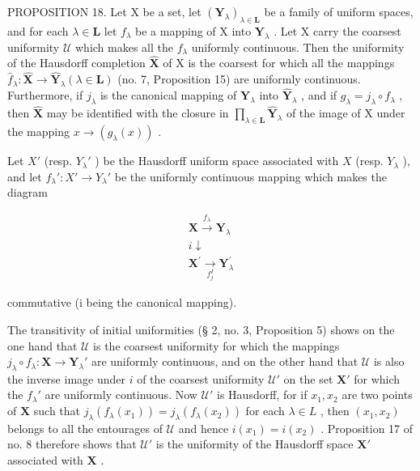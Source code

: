 PROPOSITION 18. Let X be a set, let \((\mathbf{Y}_{\lambda})_{\lambda \in \mathbf{L}}\) be a family of uniform spaces, and for each \(\lambda \in \mathbf{L}\) let \(f_{\lambda}\) be a mapping of X into \(\mathbf{Y}_{\lambda}\) . Let X carry the coarsest uniformity \(\mathcal{U}\) which makes all the \(f_{\lambda}\) uniformly continuous. Then the uniformity of the Hausdorff completion \(\hat{\mathbf{X}}\) of X is the coarsest for which all the mappings \(\hat{f}_{\lambda} \colon \hat{\mathbf{X}} \to \hat{\mathbf{Y}}_{\lambda} (\lambda \in \mathbf{L})\) (no. 7, Proposition 15) are uniformly continuous. Furthermore, if \(j_{\lambda}\) is the canonical mapping of \(\mathbf{Y}_{\lambda}\) into \(\hat{\mathbf{Y}}_{\lambda}\) , and if \(g_{\lambda} = j_{\lambda} \circ f_{\lambda}\) , then \(\hat{\mathbf{X}}\) may be identified with the closure in \(\prod_{\lambda \in \mathbf{L}} \hat{\mathbf{Y}}_{\lambda}\) of the image of X under the mapping \(x \to (g_{\lambda}(x))\) .

Let \(X'\) (resp. \(Y_{\lambda}'\) ) be the Hausdorff uniform space associated with \(X\) (resp. \(Y_{\lambda}\) ), and let \(f_{\lambda}' \colon X' \to Y_{\lambda}'\) be the uniformly continuous mapping which makes the diagram

\[
\begin{array}{c} \mathbf {X} \xrightarrow {f _ {\lambda}} \mathbf {Y} _ {\lambda} \\ i \downarrow \\ \mathbf {X ^ {\prime}} \xrightarrow [ f _ {j} ^ {I} ]{} \mathbf {Y} _ {\lambda} ^ {\prime} \end{array}
\]

commutative (i being the canonical mapping).

The transitivity of initial uniformities (§ 2, no. 3, Proposition 5) shows on the one hand that \(\mathcal{U}\) is the coarsest uniformity for which the mappings \(j_{\lambda} \circ f_{\lambda}: \mathbf{X} \to \mathbf{Y}_{\lambda}'\) are uniformly continuous, and on the other hand that \(\mathcal{U}\) is also the inverse image under \(i\) of the coarsest uniformity \(\mathcal{U}'\) on the set \(\mathbf{X}'\) for which the \(f_{\lambda}'\) are uniformly continuous. Now \(\mathcal{U}'\) is Hausdorff, for if \(x_{1}, x_{2}\) are two points of \(\mathbf{X}\) such that \(j_{\lambda}(f_{\lambda}(x_{1})) = j_{\lambda}(f_{\lambda}(x_{2}))\) for each \(\lambda \in L\) , then \((x_{1}, x_{2})\) belongs to all the entourages of \(\mathcal{U}\) and hence \(i(x_{1}) = i(x_{2})\) . Proposition 17 of no. 8 therefore shows that \(\mathcal{U}'\) is the uniformity of the Hausdorff space \(\mathbf{X}'\) associated with \(\mathbf{X}\) .

